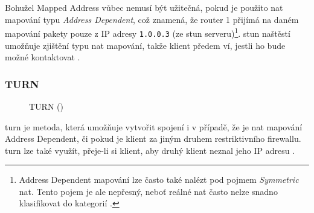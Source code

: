 Bohužel Mapped Address vůbec nemusí být užitečná, pokud je použito \gls{nat}
mapování typu \textit{Address Dependent}, což znamená, že router 1 přijímá na
daném mapování pakety pouze z IP adresy \texttt{1.0.0.3} (ze
\gls{stun} serveru)\footnote{Address Dependent mapování lze často také nalézt
    pod pojmem \textit{Symmetric} \gls{nat}. Tento pojem je ale nepřesný, neboť
    reálné \gls{nat} často nelze snadno klasifikovat do kategorií
    \parencite{IETF-RFC4787}.}. \gls{stun} naštěstí umožňuje zjištění typu \gls{nat}
mapování, takže klient předem ví, jestli ho bude možné kontaktovat
\parencite{WebRTCForTheCurious}.

\subsubsection{TURN}\label{turn}

\begin{figure}[H]
    \centering
    \caption{TURN (\publicPrivateIP)}
    \label{turnFig}
\end{figure}

\gls{turn} je metoda, která umožňuje vytvořit spojení i v případě, že je
\gls{nat} mapování Address Dependent, či pokud je klient za jiným druhem
restriktivního firewallu. \gls{turn} lze také využít, přeje-li si klient, aby
druhý klient neznal jeho IP adresu \parencite{WebRTCForTheCurious}.

